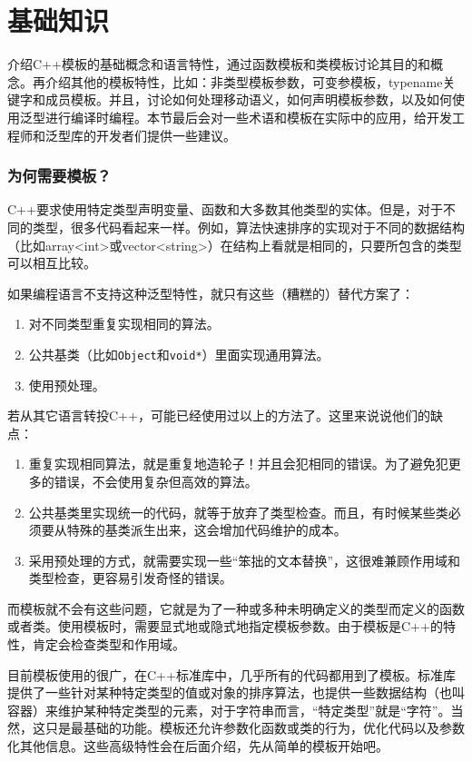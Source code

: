 \part{基础知识}

介绍C++模板的基础概念和语言特性，通过函数模板和类模板讨论其目的和概念。再介绍其他的模板特性，比如：非类型模板参数，可变参模板，typename关键字和成员模板。并且，讨论如何处理移动语义，如何声明模板参数，以及如何使用泛型进行编译时编程。本节最后会对一些术语和模板在实际中的应用，给开发工程师和泛型库的开发者们提供一些建议。

\section*{为何需要模板？}

C++要求使用特定类型声明变量、函数和大多数其他类型的实体。但是，对于不同的类型，很多代码看起来一样。例如，算法快速排序的实现对于不同的数据结构（比如array<int>或vector<string>）在结构上看就是相同的，只要所包含的类型可以相互比较。

如果编程语言不支持这种泛型特性，就只有这些（糟糕的）替代方案了：

\begin{enumerate}
  \item 对不同类型重复实现相同的算法。
  \item 公共基类（比如\texttt{Object}和\texttt{void*}）里面实现通用算法。
  \item 使用预处理。
\end{enumerate}

若从其它语言转投C++，可能已经使用过以上的方法了。这里来说说他们的缺点：

\begin{enumerate}
  \item 重复实现相同算法，就是重复地造轮子！并且会犯相同的错误。为了避免犯更多的错误，不会使用复杂但高效的算法。

  \item 公共基类里实现统一的代码，就等于放弃了类型检查。而且，有时候某些类必须要从特殊的基类派生出来，这会增加代码维护的成本。

  \item 采用预处理的方式，就需要实现一些“笨拙的文本替换”，这很难兼顾作用域和类型检查，更容易引发奇怪的错误。
\end{enumerate}

而模板就不会有这些问题，它就是为了一种或多种未明确定义的类型而定义的函数或者类。使用模板时，需要显式地或隐式地指定模板参数。由于模板是C++的特性，肯定会检查类型和作用域。

目前模板使用的很广，在C++标准库中，几乎所有的代码都用到了模板。标准库提供了一些针对某种特定类型的值或对象的排序算法，也提供一些数据结构（也叫容器）来维护某种特定类型的元素，对于字符串而言，“特定类型”就是“字符”。当然，这只是最基础的功能。模板还允许参数化函数或类的行为，优化代码以及参数化其他信息。这些高级特性会在后面介绍，先从简单的模板开始吧。













